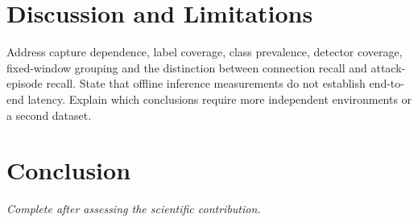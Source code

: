 \documentclass[conference]{IEEEtran}
\begin{document}
\section{Discussion and Limitations}
Address capture dependence, label coverage, class prevalence, detector coverage, fixed-window grouping and the distinction between connection recall and attack-episode recall. State that offline inference measurements do not establish end-to-end latency. Explain which conclusions require more independent environments or a second dataset.
\section{Conclusion}
\textit{Complete after assessing the scientific contribution.}


\end{document}
